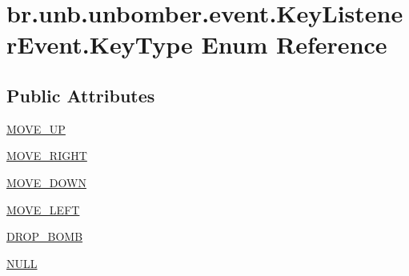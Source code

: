 \hypertarget{enumbr_1_1unb_1_1unbomber_1_1event_1_1_key_listener_event_1_1_key_type}{\section{br.\+unb.\+unbomber.\+event.\+Key\+Listener\+Event.\+Key\+Type Enum Reference}
\label{enumbr_1_1unb_1_1unbomber_1_1event_1_1_key_listener_event_1_1_key_type}
}
\subsection*{Public Attributes}
\begin{DoxyCompactItemize}
\item 
\hyperlink{enumbr_1_1unb_1_1unbomber_1_1event_1_1_key_listener_event_1_1_key_type_a7f85284ad875a0df500f4e090c0ca86d}{M\+O\+V\+E\+\_\+\+U\+P}
\item 
\hyperlink{enumbr_1_1unb_1_1unbomber_1_1event_1_1_key_listener_event_1_1_key_type_a00bc983572d8cdc04e8aa12a4c389f60}{M\+O\+V\+E\+\_\+\+R\+I\+G\+H\+T}
\item 
\hyperlink{enumbr_1_1unb_1_1unbomber_1_1event_1_1_key_listener_event_1_1_key_type_ac7621b43f04219bd4f88988c238f490a}{M\+O\+V\+E\+\_\+\+D\+O\+W\+N}
\item 
\hyperlink{enumbr_1_1unb_1_1unbomber_1_1event_1_1_key_listener_event_1_1_key_type_ae6961bbe83b61612b904f627b8908803}{M\+O\+V\+E\+\_\+\+L\+E\+F\+T}
\item 
\hyperlink{enumbr_1_1unb_1_1unbomber_1_1event_1_1_key_listener_event_1_1_key_type_a2818d3959f0b3219d260d5bac963a4af}{D\+R\+O\+P\+\_\+\+B\+O\+M\+B}
\item 
\hyperlink{enumbr_1_1unb_1_1unbomber_1_1event_1_1_key_listener_event_1_1_key_type_ab022b67dbb8c60f716f5f7f0e8787f28}{N\+U\+L\+L}
\end{DoxyCompactItemize}


